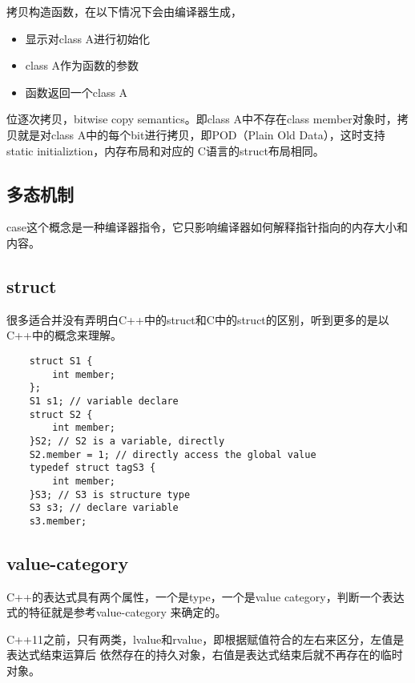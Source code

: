 拷贝构造函数，在以下情况下会由编译器生成，
\begin{itemize}
    \item {显示对class A进行初始化}
    \item {class A作为函数的参数}
    \item {函数返回一个class A}
\end{itemize}
位逐次拷贝，bitwise copy semantics。即class A中不存在class member对象时，拷贝就是对class
A中的每个bit进行拷贝，即POD（Plain Old Data），这时支持static initializtion，内存布局和对应的
C语言的struct布局相同。

\subsection{多态机制}
case这个概念是一种编译器指令，它只影响编译器如何解释指针指向的内存大小和内容。

\subsection{struct}
很多适合并没有弄明白C++中的struct和C中的struct的区别，听到更多的是以C++中的概念来理解。
\begin{lstlisting}
    struct S1 {
        int member;
    };
    S1 s1; // variable declare
    struct S2 {
        int member;
    }S2; // S2 is a variable, directly
    S2.member = 1; // directly access the global value
    typedef struct tagS3 {
        int member;
    }S3; // S3 is structure type
    S3 s3; // declare variable 
    s3.member; 
\end{lstlisting}

\subsection{value-category}
C++的表达式具有两个属性，一个是type，一个是value category，判断一个表达式的特征就是参考value-category
来确定的。

C++11之前，只有两类，lvalue和rvalue，即根据赋值符合的左右来区分，左值是表达式结束运算后
依然存在的持久对象，右值是表达式结束后就不再存在的临时对象。

